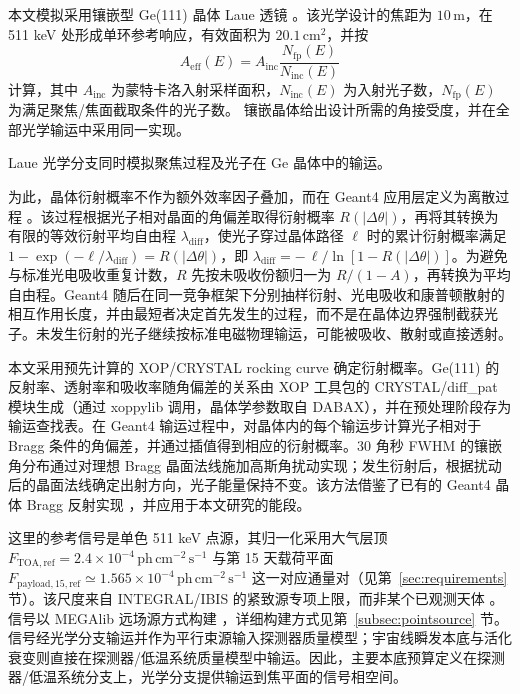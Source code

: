 \documentclass[11pt]{article}
\newcommand{\phcms}{\,\mathrm{ph\,cm^{-2}\,s^{-1}}}
\newcommand{\ftoaref}{F_{\mathrm{TOA,ref}}}
\newcommand{\fpayloadref}{F_{\mathrm{payload,15,ref}}}
\begin{document}
本文模拟采用镶嵌型 Ge(111) 晶体 Laue 透镜 \cite{Barriere2009Laue,Barriere2011LauePrototype}。该光学设计的焦距为 $10\,\mathrm{m}$，在 511 keV 处形成单环参考响应，有效面积为 $20.1\,\mathrm{cm^2}$，并按
\begin{equation}
  A_{\mathrm{eff}}(E)=A_{\mathrm{inc}}\frac{N_{\mathrm{fp}}(E)}{N_{\mathrm{inc}}(E)}
  \label{eq:laue_aeff}
\end{equation}
计算，其中 $A_{\mathrm{inc}}$ 为蒙特卡洛入射采样面积，$N_{\mathrm{inc}}(E)$ 为入射光子数，$N_{\mathrm{fp}}(E)$ 为满足聚焦/焦面截取条件的光子数。
镶嵌晶体给出设计所需的角接受度，并在全部光学输运中采用同一实现。

Laue 光学分支同时模拟聚焦过程及光子在 Ge 晶体中的输运。

为此，晶体衍射概率不作为额外效率因子叠加，而在 Geant4 应用层定义为离散过程 \cite{Agostinelli2003,Allison2016}。该过程根据光子相对晶面的角偏差取得衍射概率 $R(|\Delta\theta|)$，再将其转换为有限的等效衍射平均自由程 $\lambda_{\mathrm{diff}}$，使光子穿过晶体路径 $\ell$ 时的累计衍射概率满足 $1-\exp(-\ell/\lambda_{\mathrm{diff}})=R(|\Delta\theta|)$，即 $\lambda_{\mathrm{diff}}=-\,\ell/\ln[1-R(|\Delta\theta|)]$。为避免与标准光电吸收重复计数，$R$ 先按未吸收份额归一为 $R/(1-A)$，再转换为平均自由程。Geant4 随后在同一竞争框架下分别抽样衍射、光电吸收和康普顿散射的相互作用长度，并由最短者决定首先发生的过程，而不是在晶体边界强制截获光子。未发生衍射的光子继续按标准电磁物理输运，可能被吸收、散射或直接透射。

本文采用预先计算的 XOP/CRYSTAL rocking curve 确定衍射概率。Ge(111) 的反射率、透射率和吸收率随角偏差的关系由 XOP 工具包的 CRYSTAL/diff\_pat 模块生成（通过 xoppylib 调用，晶体学参数取自 DABAX）\cite{SanchezDelRio2011XOP}，并在预处理阶段存为输运查找表。在 Geant4 输运过程中，对晶体内的每个输运步计算光子相对于 Bragg 条件的角偏差，并通过插值得到相应的衍射概率。30 角秒 FWHM 的镶嵌角分布通过对理想 Bragg 晶面法线施加高斯角扰动实现；发生衍射后，根据扰动后的晶面法线确定出射方向，光子能量保持不变。该方法借鉴了已有的 Geant4 晶体 Bragg 反射实现 \cite{Guan2023BraggReflection,Reiazi2025G4BraggReflection}，并应用于本文研究的能段。

这里的参考信号是单色 511 keV 点源，其归一化采用大气层顶 $\ftoaref=2.4\times10^{-4}\phcms$ 与第 15 天载荷平面 $\fpayloadref\simeq1.565\times10^{-4}\phcms$ 这一对应通量对（见第~\ref{sec:requirements} 节）。该尺度来自 INTEGRAL/IBIS 的紧致源专项上限，而非某个已观测天体 \cite{DeCesare2011}。信号以 MEGAlib 远场源方式构建 \cite{Zoglauer2006}，详细构建方式见第~\ref{subsec:pointsource} 节。信号经光学分支输运并作为平行束源输入探测器质量模型；宇宙线瞬发本底与活化衰变则直接在探测器/低温系统质量模型中输运。因此，主要本底预算定义在探测器/低温系统分支上，光学分支提供输运到焦平面的信号相空间。
\end{document}
